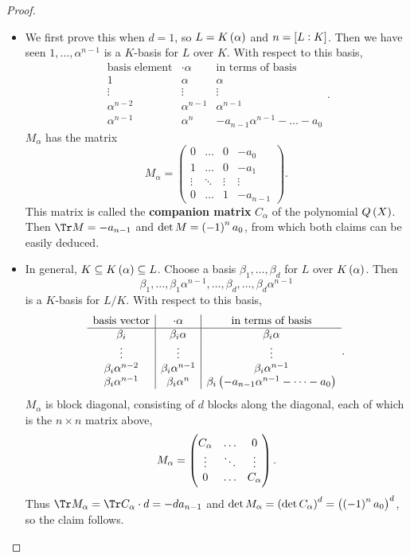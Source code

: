 \begin{proof}
\hfill
\begin{itemize}
\item We first prove this when $ d = 1 $, so $ L = K\br{\alpha} $ and $ n = \sbr{L : K} $. Then we have seen $ 1, \dots, \alpha^{n - 1} $ is a $ K $-basis for $ L $ over $ K $. With respect to this basis,
$$
\begin{array}{c|c|c}
\text{basis element} & \cdot \alpha & \text{in terms of basis} \\
\hline
1 & \alpha & \alpha \\
\vdots & \vdots & \vdots \\
\alpha^{n - 2} & \alpha^{n - 1} & \alpha^{n - 1} \\
\alpha^{n - 1} & \alpha^n & -a_{n - 1}\alpha^{n - 1} - \dots - a_0
\end{array}.
$$
$ M_\alpha $ has the matrix
$$ M_\alpha =
\begin{pmatrix}
0 & \dots & 0 & -a_0 \\
1 & \dots & 0 & -a_1 \\
\vdots & \ddots & \vdots & \vdots \\
0 & \dots & 1 & -a_{n - 1}
\end{pmatrix}.
$$
This matrix is called the \textbf{companion matrix} $ C_\alpha $ of the polynomial $ Q\br{X} $. Then $ \Tr M = -a_{n - 1} $ and $ \det M = \br{-1}^na_0 $, from which both claims can be easily deduced.
\item In general, $ K \subseteq K\br{\alpha} \subseteq L $. Choose a basis $ \beta_1, \dots, \beta_d $ for $ L $ over $ K\br{\alpha} $. Then
$$ \beta_1, \dots, \beta_1\alpha^{n - 1}, \dots, \beta_d, \dots, \beta_d\alpha^{n - 1} $$
is a $ K $-basis for $ L / K $. With respect to this basis,
$$
\begin{array}{c|c|c}
\text{basis vector} & \cdot \alpha & \text{in terms of basis} \\
\hline
\beta_i & \beta_i\alpha & \beta_i\alpha \\
\vdots & \vdots & \vdots \\
\beta_i\alpha^{n - 2} & \beta_i\alpha^{n - 1} & \beta_i\alpha^{n - 1} \\
\beta_i\alpha^{n - 1} & \beta_i\alpha^n & \beta_i\br{-a_{n - 1}\alpha^{n - 1} - \dots - a_0} \\
\end{array}.
$$
$ M_\alpha $ is block diagonal, consisting of $ d $ blocks along the diagonal, each of which is the $ n \times n $ matrix above,
$$ M_\alpha = \threebythree{C_\alpha}{\dots}{0}{\vdots}{\ddots}{\vdots}{0}{\dots}{C_\alpha}. $$
Thus $ \Tr M_\alpha = \Tr C_\alpha \cdot d = -da_{n - 1} $ and $ \det M_\alpha = \br{\det C_\alpha}^d = \br{\br{-1}^na_0}^d $, so the claim follows.
\end{itemize}
\end{proof}

